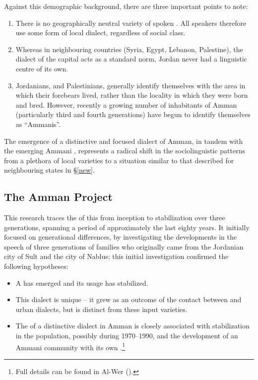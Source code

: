 \documentclass[output=paper]{langsci/langscibook}
\begin{document}
Against this demographic background, there are three important points to note:

\begin{enumerate}
\item 
There is no geographically neutral variety of spoken  . All speakers therefore use some form of local dialect, regardless of social class.

\item 
Whereas in neighbouring countries (Syria, Egypt, Lebanon, Palestine), the dialect of the capital acts as a standard  norm, Jordan never had a linguistic centre of its own.

\item 
Jordanians, and Palestinians, generally identify themselves with the area in which their forebears lived, rather than the locality in which they were born and bred. However, recently a growing number of inhabitants of Amman (particularly third and fourth generations) have begun to identify themselves as ``Ammanis''.

\end{enumerate}

The emergence of a distinctive and focused dialect of Amman, in tandem with the emerging Ammani , represents a radical shift in the sociolinguistic patterns from a plethora of local varieties to a situation similar to that described for neighbouring states in §\ref{new}.

\subsection{The Amman Project}

This research traces the  of this  from inception to stabilization over three generations, spanning a period of approximately the last eighty years. It initially focused on generational differences, by investigating the developments in the speech of three generations of families who originally came from the Jordanian city of Sult and the  city of Nablus; this initial investigation confirmed the following hypotheses:

\begin{itemize}
\item[] 
A  has emerged and its usage has stabilized.

\item[]
This dialect is unique -- it grew as an outcome of the contact between  and urban  dialects, but is distinct from these input varieties.

\item[] 
The  of a distinctive dialect in Amman is closely associated with  stabilization in the population, possibly during 1970–1990, and the development of an Ammani community with its own .\footnote{Full details can be found in Al-Wer (\citeyear{Al-Wer2002,Al-Wer2003kum}).}

\end{itemize}
\end{document}

